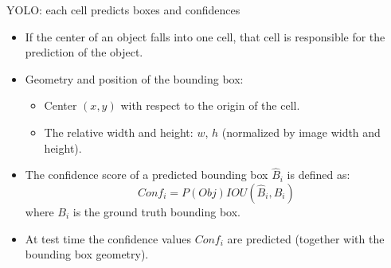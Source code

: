 \documentclass[xcolor=pdftex,dvipsnames,table]{beamer}
\begin{document}


\begin{frame}{YOLO: each cell predicts boxes and confidences}
\begin{itemize}
   \item If the center of an object falls into one cell, that cell is responsible for the prediction of the object. 
   \item Geometry and position of the bounding box: 
   \begin{itemize}
      \item Center $(x, y)$ with respect to the origin of the cell.
      \item The relative width and height: $w$, $h$ (normalized by image width and height). 
   \end{itemize}
   \item The confidence score of a predicted bounding box $\hat{B}_i$ is defined as:
   \begin{equation}\nonumber
      Conf_i = P(Obj) IOU(\hat{B}_i, B_i)
   \end{equation}
   where $B_i$ is the ground truth bounding box. 
   \item At test time the confidence values $Conf_i$ are predicted (together with the bounding box geometry). 
\end{itemize}
\end{frame}
\end{document}
